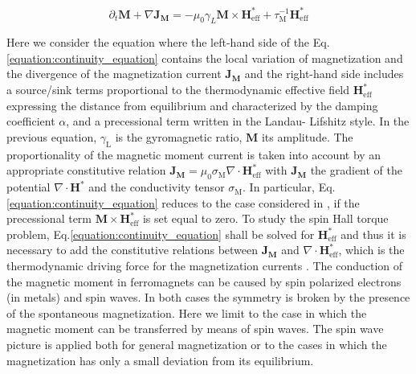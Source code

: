 \documentclass[review]{elsarticle}
\begin{document}
\begin{equation}
\label{equation:continuity_equation}
\partial_t\mathbf{M}+ \nabla\mathbf{J}_{\mathbf{M}}=-\mu_0\gamma_L\mathbf{M}\times\mathbf{H}_{\mathrm{\scriptstyle{eff}}}^* 
+\tau_{\mathrm{\scriptstyle{M}}}^{-1}\mathbf{H}_{\mathrm{\scriptstyle{eff}}}^*
\end{equation}

Here we consider the equation where the left-hand side of the Eq.\ref{equation:continuity_equation} contains the local variation of magnetization and the divergence of the  
magnetization current $\mathbf{J}_{\mathbf{M}}$ and the right-hand side includes a source/sink terms proportional to the thermodynamic effective field $\mathbf{H}
_{\mathrm{\scriptstyle{eff}}}^*$ expressing the distance from equilibrium and characterized by the damping coefficient $\alpha$, and a precessional term written in the Landau-
Lifshitz style. In the previous equation, $\gamma_{\mathrm{\scriptstyle{L}}}$ is the gyromagnetic ratio, $\mathbf{M}$ its amplitude. The proportionality of the magnetic 
moment current is taken into account by an appropriate constitutive relation  $\mathbf{J}_{\mathbf{M}}=\mu_0\sigma_{\mathrm{\scriptstyle{M}}}\nabla\cdot\mathbf{H}
_{\mathrm{\scriptstyle{eff}}}^*$ with $\mathbf{J}_{\mathbf{M}}$  the gradient of the potential $\nabla\cdot\mathbf{H}^*$ and the conductivity tensor $
\sigma_{\mathrm{\scriptstyle{M}}}$. In particular, Eq.\ref{equation:continuity_equation} reduces to the case considered in \cite{basso2016nonequilibrium}, 
\cite{basso2016thermodynamic} if the precessional term  $\mathbf{M} \times\mathbf{H}^*_{\mathrm{\scriptstyle{eff}}}$ is set equal to zero. To study the spin Hall torque 
problem, Eq.\ref{equation:continuity_equation} shall be solved for $\mathbf{H}^*_{\mathrm{\scriptstyle{eff}}}$ and thus it is necessary to add the constitutive relations 
between $\mathbf{J}_{\mathbf{M}} $ and $\nabla\cdot\mathbf{H}^*_{\mathrm{\scriptstyle{eff}}}$, which is the thermodynamic driving force for the magnetization 
currents \cite{basso2016nonequilibrium, basso2016thermodynamic}. The conduction of the magnetic moment in ferromagnets can be caused by spin polarized electrons (in metals) and 
spin waves. In both cases the symmetry is broken by the presence of the spontaneous magnetization. Here we limit to the case in which the magnetic moment can be transferred by 
means of spin waves. The spin wave picture is applied both for  general magnetization or to the cases in which the magnetization has only a small deviation from its equilibrium.
\end{document}
